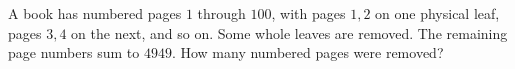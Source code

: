 A book has numbered pages $1$ through $100$, with pages $1,2$ on one physical leaf, pages $3,4$ on the next, and so on. Some whole leaves are removed. The remaining page numbers sum to $4949$. How many numbered pages were removed?
